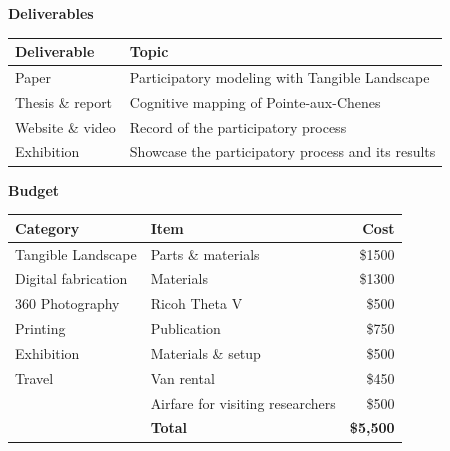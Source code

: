 \documentclass[11pt,article,oneside]{memoir}
\begin{document}

\noindent \textbf{Deliverables}
%
%
\begin{table}[H]
\small
\begin{tabu} to \textwidth {lX}
\toprule
Deliverable & Topic\\
\midrule
Paper & Participatory modeling with Tangible Landscape\\
Thesis \& report & Cognitive mapping of Pointe-aux-Chenes\\
Website \& video & Record of the participatory process\\
Exhibition & Showcase the participatory process and its results\\
\bottomrule
\end{tabu}
\end{table}

\noindent \textbf{Budget}
%
\begin{table}[H]
\small
\begin{tabu} to \textwidth {lXr}
\toprule
Category & Item & Cost\\
\midrule
Tangible Landscape & Parts \& materials & \$1500 \\
Digital fabrication & Materials & \$1300 \\
360 Photography & Ricoh Theta V & \$500 \\
Printing & Publication & \$750 \\
Exhibition & Materials \& setup & \$500 \\
Travel & Van rental & \$450 \\
& Airfare for visiting researchers & \$500 \\
& \textbf{Total} & \textbf{\$5,500}\\
\bottomrule
\end{tabu}
\end{table}
\end{document}
